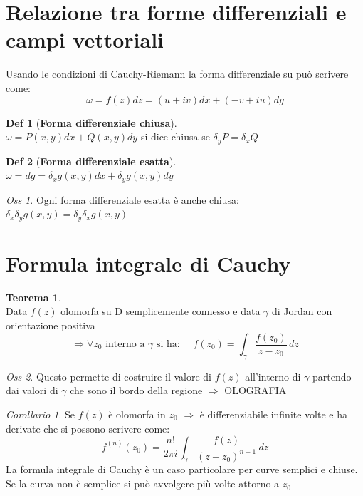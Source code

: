 \documentclass[a4paper,11pt]{report}
\theoremstyle{remark}
\newtheorem*{oss}{Oss}
\newtheorem*{coro}{Corollario}
\theoremstyle{definition}
\newtheorem*{teo}{Teorema}
\newtheorem*{Def}{Def}
\begin{document}
\section{Relazione tra forme differenziali e campi vettoriali}
	Usando le condizioni di Cauchy-Riemann la forma differenziale su può scrivere come:
	\[\omega = f(z)dz = (u+iv)dx + (-v+iu)dy\]

	\begin{Def}[\textbf{Forma differenziale chiusa}]\hfil\\
		$\omega = P(x,y)dx + Q(x,y)dy$ \quad si dice chiusa se $\delta_y P = \delta_x Q$
	\end{Def}

	\begin{Def}[\textbf{Forma differenziale esatta}]\hfil\\
		$\omega = dg = \delta_x g(x,y)dx + \delta_y g(x,y)dy$
	\end{Def}

	\begin{oss}
		Ogni forma differenziale esatta è anche chiusa: $\delta_x\delta_y g(x,y) = \delta_y\delta_x g(x,y)$
	\end{oss}
\section{Formula integrale di Cauchy}

	\begin{teo}\hfil\\
		Data $f(z)$ olomorfa su D semplicemente connesso e data $\gamma$ di Jordan con orientazione positiva 
		\[\Rightarrow \forall z_0 \mbox{ interno a } \gamma \text{ si ha: } \quad 
		f(z_0) = \int_\gamma \frac {f(z_0)}{z-z_0} \,dz\]
	\end{teo}

	\begin{oss}
		Questo permette di costruire il valore di $f(z)$ all'interno di $\gamma$ partendo dai valori di $\gamma$ che sono il bordo della regione $\Rightarrow$ OLOGRAFIA
	\end{oss}

	\begin{coro}
		Se $f(z)$ è olomorfa in $z_0$ $\Rightarrow$ è differenziabile infinite volte e ha derivate che si possono scrivere come: 
		\[f^{(n)}(z_0)= \frac{n!}{2\pi i} \int_\gamma \frac{f(z)}{(z-z_0)^{n+1}} \, dz\]
		La formula integrale di Cauchy è un caso particolare per curve semplici e chiuse. Se la curva non è semplice si può avvolgere più volte attorno a $z_0$
	\end{coro}
\end{document}
